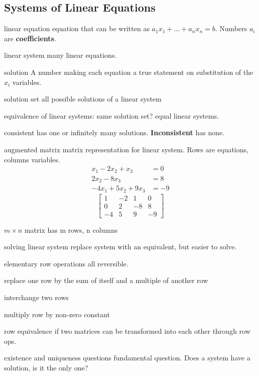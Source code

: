\begin{card}
    \subsection{Systems of Linear Equations}

    \begin{compactdesc}
    \item[linear equation] equation that can be written as
        $a_1x_1 + \dots + a_nx_n = b$.
        Numbers $a_i$ are \textbf{coefficients}.
    \item[linear system] many linear equations.
    \item[solution] A number making each equation a true
        statement on substitution of the $x_i$ variables.
    \item[solution set] all possible solutions of a linear system
    \item[equivalence] of linear systems: same solution set? equal linear systems.
    \item[consistent] has one or infinitely many solutions. \textbf{Inconsistent} has none.
    \item[augmented matrix] matrix representation for linear system.
        Rows are equations, columns variables.
        \begin{align*}
        x_1 - 2x_2 + x_3   &= 0 \\
              2x_2 - 8x_3  &= 8 \\
        -4x_1 + 5x_2 + 9x_3 &= -9
        \end{align*}
        \[
        \left[
        \begin{array}{ccc|c}
            1 & -2 & 1 & 0  \\
            0 & 2  & -8 & 8 \\
            -4 & 5 & 9 & -9
        \end{array}
        \right]
        \]
    \item[$m \times n$ matrix] has m rows, n columns
    \item[solving linear system] replace system with an equivalent, but
        easier to solve.
    \item[elementary row operations] all reversible.
        \begin{compactenum}
        \item replace one row by the sum of itself and a multiple of
            another row
        \item interchange two rows
        \item multiply row by non-zero constant
        \end{compactenum}
    \item[row equivalence] if two matrices can be transformed into
        each other through row ops.
    \item[existence and uniqueness questions] fundamental question. Does
        a system have a solution, is it the only one?
    \end{compactdesc}
\end{card}



